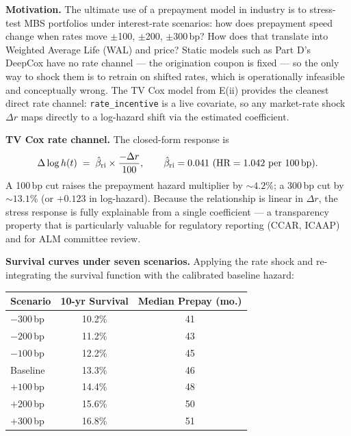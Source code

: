 \documentclass[11pt,a4paper]{article}
\begin{document}
\textbf{Motivation.} The ultimate use of a prepayment model in industry is to stress-test MBS portfolios under interest-rate scenarios: how does prepayment speed change when rates move $\pm$100, $\pm$200, $\pm$300\,bp? How does that translate into Weighted Average Life (WAL) and price? Static models such as Part D's DeepCox have no rate channel --- the origination coupon is fixed --- so the only way to shock them is to retrain on shifted rates, which is operationally infeasible and conceptually wrong. The TV Cox model from E(ii) provides the cleanest direct rate channel: \texttt{rate\_incentive} is a live covariate, so any market-rate shock $\Delta r$ maps directly to a log-hazard shift via the estimated coefficient.

\textbf{TV Cox rate channel.} The closed-form response is
\[
  \Delta \log h(t) \;=\; \hat\beta_{\text{ri}} \times \frac{-\Delta r}{100},
  \qquad \hat\beta_{\text{ri}} = 0.041 \text{ (HR} = 1.042 \text{ per 100\,bp)}.
\]
A 100\,bp cut raises the prepayment hazard multiplier by $\sim 4.2\%$; a 300\,bp cut by $\sim 13.1\%$ (or $+0.123$ in log-hazard). Because the relationship is linear in $\Delta r$, the stress response is fully explainable from a single coefficient --- a transparency property that is particularly valuable for regulatory reporting (CCAR, ICAAP) and for ALM committee review.

\textbf{Survival curves under seven scenarios.} Applying the rate shock and re-integrating the survival function with the calibrated baseline hazard:

\begin{center}
  \small
  \begin{tabular}{lcc}
    \toprule
    Scenario   & 10-yr Survival & Median Prepay (mo.) \\
    \midrule
    $-300$\,bp & 10.2\%         & 41                  \\
    $-200$\,bp & 11.2\%         & 43                  \\
    $-100$\,bp & 12.2\%         & 45                  \\
    Baseline   & 13.3\%         & 46                  \\
    $+100$\,bp & 14.4\%         & 48                  \\
    $+200$\,bp & 15.6\%         & 50                  \\
    $+300$\,bp & 16.8\%         & 51                  \\
    \bottomrule
  \end{tabular}
\end{center}
\end{document}
